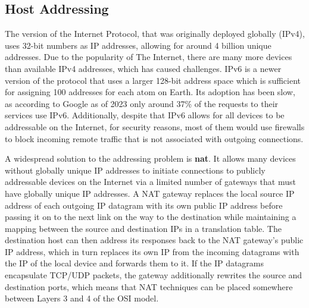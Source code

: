\hypertarget{host-addressing}{%
\subsection{Host Addressing}\label{host-addressing}}

The version of the Internet Protocol, that was originally deployed
globally (IPv4), uses 32-bit numbers as IP addresses, allowing for
around 4 billion unique addresses. Due to the popularity of The
Internet, there are many more devices than available IPv4 addresses,
which has caused challenges. IPv6 is a newer version of the protocol
that uses a larger 128-bit address space which is sufficient for
assigning 100 addresses for each atom on Earth. Its adoption has been
slow, as according to Google as of 2023 only around 37\% of the requests
to their services use IPv6. Additionally, despite that IPv6 allows for
all devices to be addressable on the Internet, for security reasons,
most of them would use firewalls to block incoming remote traffic that
is not associated with outgoing connections.

A widespread solution to the addressing problem is \textbf{\gls{nat}}.
It allows many devices without globally unique IP addresses to initiate
connections to publicly addressable devices on the Internet via a
limited number of gateways that must have globally unique IP addresses.
A NAT gateway replaces the local source IP address of each outgoing IP
datagram with its own public IP address before passing it on to the next
link on the way to the destination while maintaining a mapping between
the source and destination IPs in a translation table. The destination
host can then address its responses back to the NAT gateway's public IP
address, which in turn replaces its own IP from the incoming datagrams
with the IP of the local device and forwards them to it. If the IP
datagrams encapsulate TCP/UDP packets, the gateway additionally rewrites
the source and destination ports, which means that NAT techniques can be
placed somewhere between Layers 3 and 4 of the OSI model.

